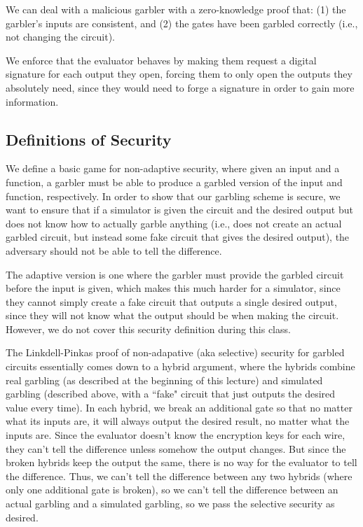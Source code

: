 \documentclass[11pt]{article}
\begin{document}
We can deal with a malicious garbler with a zero-knowledge proof that:
(1) the garbler's inputs are consistent, and 
(2) the gates have been garbled correctly (i.e., not changing the circuit).

We enforce that the evaluator behaves by making them request a digital signature for each output they open,
forcing them to only open the outputs they absolutely need, since they would need to forge a signature in order to gain more information.

\subsection{Definitions of Security}
We define a basic game for non-adaptive security, where given an input and a function, a garbler must be able to produce a garbled version of the input and function, respectively.
In order to show that our garbling scheme is secure, we want to ensure that if a simulator is given the circuit and the desired output but does not know how to actually garble anything (i.e., does not create an actual garbled circuit, but instead some fake circuit that gives the desired output), the adversary should not be able to tell the difference.

The adaptive version is one where the garbler must provide the garbled circuit before the input is given, which makes this much harder for a simulator, since they cannot simply create a fake circuit that outputs a single desired output, since they will not know what the output should be when making the circuit. However, we do not cover this security definition during this class.\medskip

The Linkdell-Pinkas proof of non-adapative (aka selective) security for garbled circuits essentially comes down to a hybrid argument, where the hybrids combine real garbling (as described at the beginning of this lecture) and simulated garbling (described above, with a ``fake" circuit that just outputs the desired value every time). 
In each hybrid, we break an additional gate so that no matter what its inputs are, it will always output the desired result, no matter what the inputs are.
Since the evaluator doesn't know the encryption keys for each wire, they can't tell the difference unless somehow the output changes.
But since the broken hybrids keep the output the same, there is no way for the evaluator to tell the difference.
Thus, we can't tell the difference between any two hybrids (where only one additional gate is broken),
so we can't tell the difference between an actual garbling and a simulated garbling, so we pass the selective security as desired.
\end{document}
